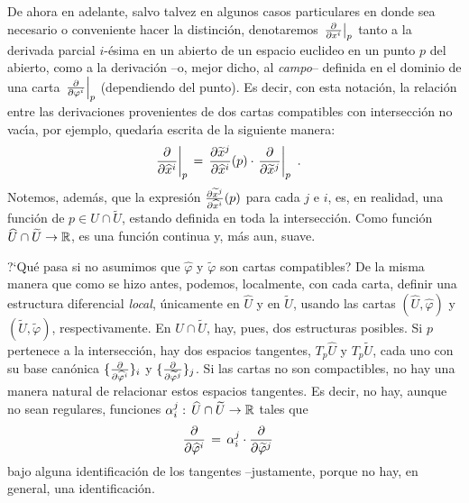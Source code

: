 De ahora en adelante, salvo talvez en algunos casos particulares en donde
sea necesario o conveniente hacer la distinci\'{o}n, denotaremos
$\gancho[p]{x^{i}}$ tanto a la derivada parcial $i$-\'{e}sima en un abierto
de un espacio euclideo en un punto $p$ del abierto, como a la derivaci\'{o}n
--o, mejor dicho, al \emph{campo}-- definida en el dominio de una carta
$\gancho[p]{\varphi^{i}}$ (dependiendo del punto). Es decir, con esta
notaci\'{o}n, la relaci\'{o}n entre las derivaciones provenientes de dos
cartas compatibles con intersecci\'{o}n no vac\'{\i}a, por ejemplo,
quedar\'{\i}a escrita de la siguiente manera:
\begin{align*}
	\gancho[p]{\widehat{x}^{i}} & \,=\,
		\derivada{\widetilde{x}^{j}}{\widehat{x}^{i}}(p)\cdot
		\gancho[p]{\widetilde{x}^{j}}
	\text{ .}
\end{align*}
%
Notemos, adem\'{a}s, que la expresi\'{o}n
$\frac{\partial{\widetilde{x}^{j}}}{\partial{\widehat{x}^{i}}}(p)$ para cada $j$ e $i$, es,
en realidad, una funci\'{o}n de $p\in\widehat{U}\cap\widetilde{U}$,
estando definida en toda la intersecci\'{o}n. Como funci\'{o}n
$\widehat{U}\cap\widetilde{U}\rightarrow\mathbb{R}$, es una funci\'{o}n
continua y, m\'{a}s aun, suave.

\begin{obsSiLasCartasNoSonCompatibles}\label{obs:sinosoncompatibles}
	?`Qu\'{e} pasa si no asumimos que $\widehat{\varphi}$ y
	$\widetilde{\varphi}$ son cartas compatibles? De la misma manera
	que como se hizo antes, podemos, localmente, con cada carta,
	definir una estructura diferencial \emph{local}, \'{u}nicamente
	en $\widehat{U}$ y en $\widetilde{U}$, usando las cartas
	$(\widehat{U},\widehat{\varphi})$ y
	$(\widetilde{U},\widetilde{\varphi})$, respectivamente. En
	$\widehat{U}\cap\widetilde{U}$, hay, pues, dos estructuras posibles.
	Si $p$ pertenece a la intersecci\'{o}n, hay dos espacios
	tangentes, $T_{p}\widehat{U}$ y $T_{p}\widetilde{U}$, cada uno
	con su base can\'{o}nica
	$\{\gancho{\widehat{\varphi}^{i}}\}_{i}$ y
	$\{\gancho{\widetilde{\varphi}^{j}}\}_{j}$. Si las cartas no
	son compactibles, no hay una manera natural de relacionar estos
	espacios tangentes. Es decir, no hay, aunque no sean regulares,
	funciones $\alpha^{j}_{i}:\,%
	\widehat{U}\cap\widetilde{U}\rightarrow\bb{R}$ tales que
	\begin{align*}
		\gancho{\widehat{\varphi}^{i}} & \,=\,\alpha^{j}_{i}\cdot
			\gancho{\widetilde{\varphi}^{j}}
	\end{align*}
	bajo alguna identificaci\'{o}n de los tangentes --justamente, porque
	no hay, en general, una identificaci\'{o}n.
\end{obsSiLasCartasNoSonCompatibles}
